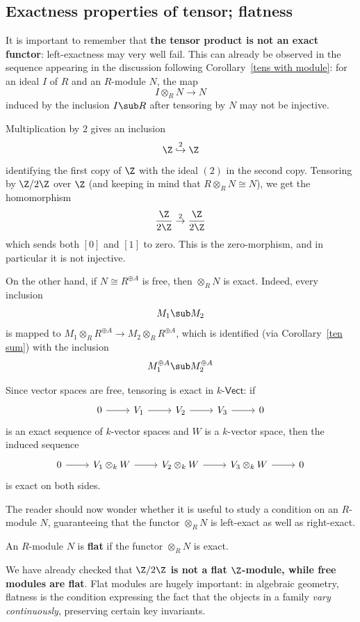 \subsection{Exactness properties of tensor; flatness}
It is important to remember that \textbf{the tensor product is not an exact functor}: left-exactness may very well fail. This can already be observed in the sequence appearing in the discussion following Corollary~\ref{tens with module}: for an ideal $I$ of $R$ and an $R$-module $N$, the map
\[I\otimes_{R}N\to N\]
induced by the inclusion $I\sub R$ after tensoring by $N$ may not be injective.
\begin{example}
Multiplication by $2$ gives an inclusion
\[\Z\stackrel{2}{\hookrightarrow}\Z\]
identifying the first copy of $\Z$ with the ideal $(2)$ in the second copy. Tensoring by $\Z/2\Z$ over $\Z$ (and keeping in mind that $R\otimes_{R}N\cong N$), we get the homomorphism
\[\dfrac{\Z}{2\Z}\stackrel{2}{\to}\dfrac{\Z}{2\Z}\]
which sends both $[0]$ and $[1]$ to zero. This is the zero-morphism, and in particular it is not injective.
\end{example}
On the other hand, if $N\cong R^{\oplus A}$ is free, then $\otimes_{R}N$ is exact. Indeed, every
inclusion
\[M_1\sub M_2\]
is mapped to $M_1\otimes_{R}R^{\oplus A}\to M_2\otimes_{R}R^{\oplus A}$, which is identified (via Corollary~\ref{ten sum}) with the inclusion
\[M_1^{\oplus A}\sub M_2^{\oplus A}\]
\begin{example}
Since vector spaces are free, tensoring is exact in $k$-$\mathsf{Vect}$: if
\[\begin{tikzcd}
0\ar[r]&V_1\ar[r]&V_2\ar[r]&V_3\ar[r]&0
\end{tikzcd}\]
is an exact sequence of $k$-vector spaces and $W$ is a $k$-vector space, then the induced sequence
\[\begin{tikzcd}
0\ar[r]&V_1\otimes_{k}W\ar[r]&V_2\otimes_{k}W\ar[r]&V_3\otimes_{k}W\ar[r]&0
\end{tikzcd}\]
is exact on both sides.
\end{example}
The reader should now wonder whether it is useful to study a condition on an $R$-module $N$, guaranteeing that the functor $\otimes_{R}N$ is left-exact as well as right-exact.
\begin{definition}
An $R$-module $N$ is \textbf{flat} if the functor $\otimes_{R}N$ is exact.
\end{definition}
We have already checked that \textbf{$\Z/2\Z$ is not a flat $\Z$-module, while free modules are flat}. Flat modules are hugely important: in algebraic geometry, flatness is the condition expressing the fact that the objects in a family \textit{vary continuously}, preserving certain key invariants.
